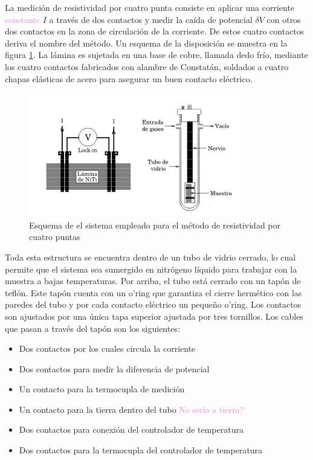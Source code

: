 \documentclass[12pt]{article}
\theoremstyle{definition}
\theoremstyle{remark}
\begin{document}
{La medición de resistividad por cuatro punta consiste en aplicar una corriente \textcolor{violet}{constante} $I$ a través de dos contactos y medir  la caída de potencial $\delta V$ con otros dos contactos en la zona de circulación de la corriente. De estos cuatro contactos deriva el nombre del método. Un esquema de la disposición se muestra en la figura \ref{4puntas}. La lámina es sujetada en una base de cobre, llamada dedo frío, mediante los cuatro contactos fabricados con alambre de Constatán, soldados a cuatro chapas elásticas de acero para asegurar un buen contacto eléctrico.

 \begin{figure}[H]
 	\centering
	\includegraphics[scale=1]{img/r4puntas.png}
 	\caption{Esquema de el sistema empleado para el método de resistividad por  cuatro puntas}
	\label{4puntas}
\end{figure} 

Toda esta estructura se encuentra dentro de un tubo de vidrio cerrado, lo cual permite que el sistema sea sumergido en nitrógeno líquido para trabajar con la muestra a bajas temperaturas. Por arriba, el tubo está cerrado con un tapón de teflón. Este tapón cuenta con un o'ring que garantiza el cierre hermético con las paredes del tubo y por cada contacto eléctrico un pequeño o'ring. Los contactos son ajustados por una única tapa superior ajustada por tres tornillos. Los cables que pasan a través del tapón son los siguientes:
\begin{itemize}
\item Dos contactos por los cuales circula la corriente 
\item Dos contactos para medir la diferencia de potencial
\item Un contacto para la termocupla de medición
\item Un contacto para la tierra dentro del tubo \textcolor{violet}{No sería a tierra?}
\item Dos contactos para conexión del controlador de temperatura
\item Dos contactos para la termocupla del controlador de temperatura
\end{itemize}


}
\end{document}
